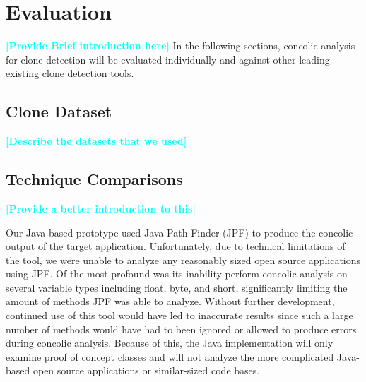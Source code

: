 \documentclass[smallextended]{svjour3}       %
\newcommand{\todo}[1]{\textcolor{cyan}{\textbf{[#1]}}}
\begin{document}
\section{Evaluation}
\label{sec: evaluation}

\todo{Provide Brief introduction here}
In the following sections, concolic analysis for clone detection will be evaluated individually and against other leading existing clone detection tools.



\subsection{Clone Dataset}
\todo{Describe the datasets that we used}

%	
% 





\subsection{Technique Comparisons} %

\todo{Provide a better introduction to this}

Our Java-based prototype used Java Path Finder (JPF) to produce the concolic output of the target application. Unfortunately, due to technical limitations of the tool, we were unable to analyze any reasonably sized open source applications using JPF. Of the most profound was its inability perform concolic analysis on several variable types including float, byte, and short, significantly limiting the amount of methods JPF was able to analyze. Without further development, continued use of this tool would have led to inaccurate results since such a large number of methods would have had to been ignored or allowed to produce errors during concolic analysis. Because of this, the Java implementation will only examine proof of concept classes and will not analyze the more complicated Java-based open source applications or similar-sized code bases.
\end{document}
